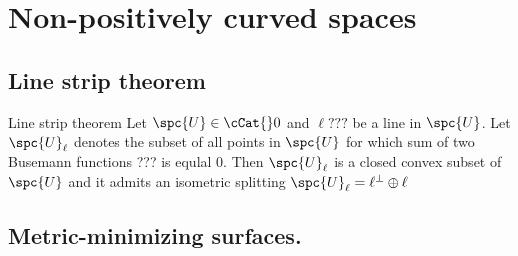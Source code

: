 \chapter{Non-positively curved spaces}

\section{Line strip theorem}

\begin{thm}{Line strip theorem}\label{split=<0}
Let $\spc{U}\in\cCat{}0$ and $\ell???$ be a line in $\spc{U}$.
Let $\spc{U}_\ell$ denotes the subset of all points in $\spc{U}$ for which sum of two Busemann functions ??? is equlal $0$.
Then $\spc{U}_\ell$ is a closed convex subset of $\spc{U}$ and it admits an isometric splitting $\spc{U}_\ell=\ell^\perp\oplus\ell$
\end{thm}



\section{Metric-minimizing surfaces.}\label{sec:metric-min-surfaces}